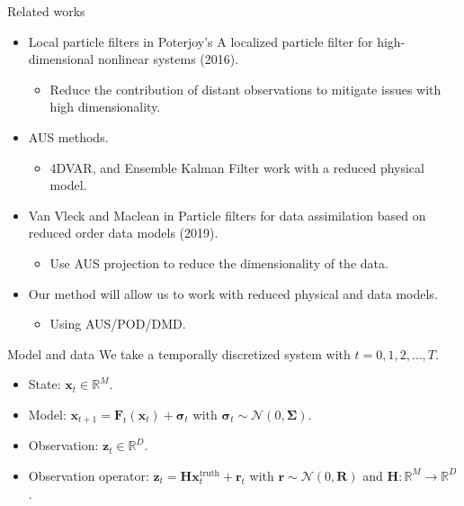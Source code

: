 \documentclass[aspectratio=169]{beamer}
\newcommand{\R}{\mathbb{R}}
\newcommand{\state}{\boldsymbol{x}}
\newcommand{\observation}{\boldsymbol{z}}
\newcommand{\obsop}{\boldsymbol{H}}
\newcommand{\modelerror}{\boldsymbol{\sigma}}
\newcommand{\modelcovariance}{\boldsymbol{\Sigma}}
\newcommand{\observationerror}{\boldsymbol{r}}
\newcommand{\observationcovariance}{\boldsymbol{R}}
\newcommand{\modelf}{\boldsymbol{F}}
\begin{document}
\begin{frame}{Related works}
\vfill
\begin{itemize}
    \pause
    \item Local particle filters in Poterjoy’s A localized particle filter for high-dimensional nonlinear systems (2016).
        \begin{itemize}
            \item Reduce the contribution of distant observations to mitigate issues with high dimensionality.
        \end{itemize}
    \pause
    \item AUS methods.
        \begin{itemize} 
            \item 4DVAR, and Ensemble Kalman Filter work with a reduced physical model.
        \end{itemize}
    \pause
    \item Van Vleck and Maclean in Particle filters for data assimilation based on reduced order data models (2019).
        \begin{itemize}
            \item Use AUS projection to reduce the dimensionality of the data.
        \end{itemize}
    \pause
    \item Our method will allow us to work with reduced physical and data models.
        \begin{itemize}
            \item Using AUS/POD/DMD.
        \end{itemize}
\end{itemize}
\vfill
\end{frame}


\begin{frame}{Model and data}
\vfill
    \pause
We take a temporally discretized system with $t=0,1,2,\dots, T$. 
    \begin{itemize}
    \pause
        \item State: $\state_t \in \R^M$.
    \pause
        \item Model: $\state_{t+1} = \modelf_t(\state_t) + \modelerror_t$ with $\modelerror_t \sim \mathcal{N}(0,\modelcovariance)$.
    \pause
        \item Observation: $\observation_t \in \R^D$.
    \pause
        \item Observation operator: $\observation_t = \obsop \state_t^{\textrm{truth}} + \observationerror_t$ with $\observationerror \sim \mathcal{N}(0,\observationcovariance)$ and $\obsop\colon \R^M \to \R^D$.
    \end{itemize}
\vfill
\end{frame}
\end{document}
